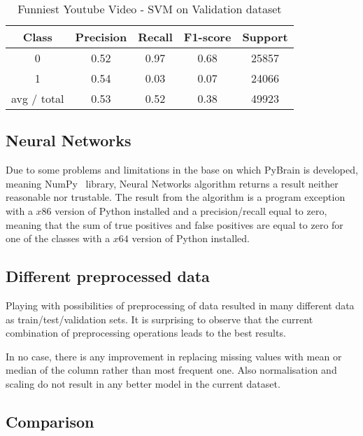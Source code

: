 \begin{table}[p]
\begin{center}
\begin{tabular}{|c|c|c|c|c|}
\hline Class & Precision & Recall & F1-score & Support \\

\hline 0 & 0.52 & 0.97 & 0.68 & 25857\\
\hline 1 & 0.54 & 0.03 & 0.07 & 24066\\
\hline avg / total & 0.53 & 0.52 & 0.38 & 49923\\
\hline
\end{tabular}

\caption{Funniest Youtube Video - SVM on Validation dataset}
\label{table:ds3:svm-test}
\end{center}
\end{table}


\subsection{Neural Networks}

Due to some problems and limitations in the base on which PyBrain is developed,
meaning NumPy~\cite{oliphant2006guide} library, Neural Networks algorithm returns a result neither 
reasonable nor trustable. The result from the algorithm is a
program exception with a $x86$ version of Python installed and a
precision/recall equal to zero, meaning that the sum of true positives and false
positives are equal to zero for one of the
classes with a $x64$ version of Python installed.


\subsection{Different preprocessed data}

Playing with possibilities of preprocessing of data resulted in many different
data as train/test/validation sets. It is surprising to observe that the current
combination of preprocessing operations leads to the best results. 

In no case, there is any improvement in replacing missing values with mean or
median of the column rather than most frequent one. Also normalisation and
scaling do not result in any better model in the current dataset.

\subsection{Comparison}

